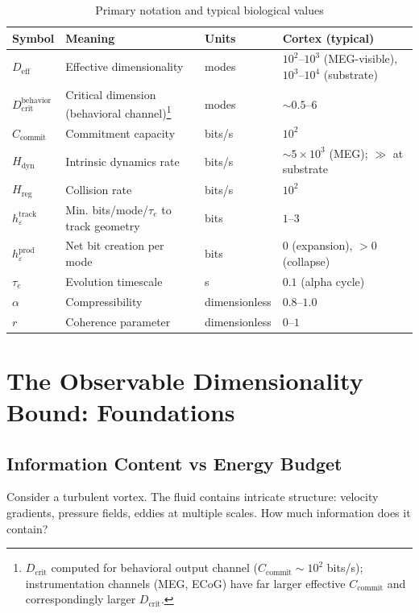 \documentclass[12pt]{article}
\begin{document}
\begin{table}[h]
\centering
\small
\caption{Primary notation and typical biological values}
\begin{tabular}{llll}
\toprule
Symbol & Meaning & Units & Cortex (typical) \\
\midrule
$D_{\text{eff}}$ & Effective dimensionality & modes & $10^2$--$10^3$ (MEG-visible), $10^3$--$10^4$ (substrate) \\
$D_{\text{crit}}^{\text{behavior}}$ & Critical dimension (behavioral channel)\footnote{$D_{\text{crit}}$ computed for behavioral output channel ($C_{\text{commit}} \sim 10^2$ bits/s); instrumentation channels (MEG, ECoG) have far larger effective $C_{\text{commit}}$ and correspondingly larger $D_{\text{crit}}$.} & modes & $\sim 0.5$--$6$ \\
$C_{\text{commit}}$ & Commitment capacity & bits/s & $10^2$ \\
$H_{\text{dyn}}$ & Intrinsic dynamics rate & bits/s & $\sim 5\times10^3$ (MEG); $\gg$ at substrate \\
$H_{\text{reg}}$ & Collision rate & bits/s & $10^2$ \\
$h_\varepsilon^{\text{track}}$ & Min. bits/mode/$\tau_e$ to track geometry & bits & $1$--$3$ \\
$h_\varepsilon^{\text{prod}}$ & Net bit creation per mode & bits & $0$ (expansion), $>0$ (collapse) \\
$\tau_e$ & Evolution timescale & s & $0.1$ (alpha cycle) \\
$\alpha$ & Compressibility & dimensionless & $0.8$--$1.0$ \\
$r$ & Coherence parameter & dimensionless & $0$--$1$ \\
\bottomrule
\end{tabular}
\end{table}

\section{The Observable Dimensionality Bound: Foundations}

\subsection{Information Content vs Energy Budget}

Consider a turbulent vortex. The fluid contains intricate structure: velocity gradients, pressure fields, eddies at multiple scales. How much information does it contain?
\end{document}
